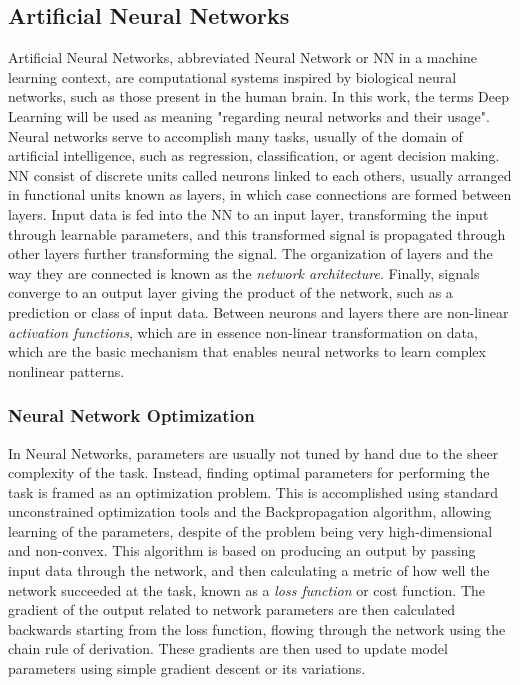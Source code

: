 \subsection{Artificial Neural Networks}

Artificial Neural Networks, abbreviated Neural Network or NN in a machine learning context, are computational systems inspired by biological neural networks, such as those present in the human brain. In this work, the terms Deep Learning will be used as meaning "regarding neural networks and their usage". Neural networks serve to accomplish many tasks, usually of the domain of artificial intelligence, such as regression, classification, or agent decision making. NN consist of discrete units called neurons linked to each others, usually arranged in functional units known as layers, in which case connections are formed between layers. Input data is fed into the NN to an input layer, transforming the input through learnable parameters, and this transformed signal is propagated through other layers further transforming the signal. The organization of layers and the way they are connected is known as the \textit{network architecture}. Finally, signals converge to an output layer giving the product of the network, such as a prediction or class of input data. Between neurons and layers there are non-linear \textit{activation functions}, which are in essence non-linear transformation on data, which are the basic mechanism that enables neural networks to learn complex nonlinear patterns.

\subsubsection*{Neural Network Optimization}

In Neural Networks, parameters are usually not tuned by hand due to the sheer complexity of the task. Instead, finding optimal parameters for performing the task is framed as an optimization problem. This is accomplished using standard unconstrained optimization tools and the Backpropagation algorithm, allowing learning of the parameters, despite of the problem being very high-dimensional and non-convex. This algorithm is based on producing an output by passing input data through the network, and then calculating a metric of how well the network succeeded at the task, known as a \textit{loss function} or cost function. The gradient of the output related to network parameters are then calculated backwards starting from the loss function, flowing through the network using the chain rule of derivation. These gradients are then used to update model parameters using simple gradient descent or its variations. 

